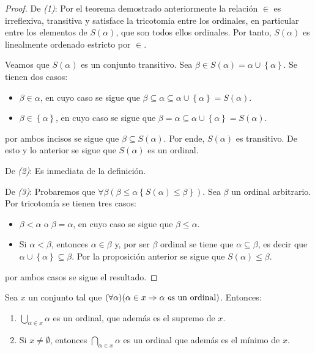 \documentclass[12pt]{report}
\newcounter{it}
\theoremstyle{largebreak}
\begin{document}
    \begin{proof}
        De \textit{(1)}: Por el teorema demostrado anteriormente la relación $\in$ es irreflexiva, transitiva y satisface la tricotomía entre los ordinales, en particular entre los elementos de $S(\alpha)$, que son todos ellos ordinales. Por tanto, $S(\alpha)$ es linealmente ordenado estricto por $\in$.

        Veamos que $S(\alpha)$ es un conjunto transitivo. Sea $\beta\in S(\alpha)=\alpha\cup\left\{\alpha\right\}$. Se tienen dos casos:
        \begin{itemize}
            \item $\beta\in\alpha$, en cuyo caso se sigue que $\beta\subseteq\alpha\subseteq\alpha\cup\left\{\alpha\right\}=S(\alpha)$.
            \item $\beta\in\left\{\alpha\right\}$, en cuyo caso se sigue que $\beta=\alpha\subseteq\alpha\cup\left\{\alpha\right\}=S(\alpha)$.            
        \end{itemize}
        por ambos incisos se sigue que $\beta\subseteq S(\alpha)$. Por ende, $S(\alpha)$ es transitivo. De esto y lo anterior se sigue que $S(\alpha)$ es un ordinal.

        De \textit{(2)}: Es inmediata de la definición.

        De \textit{(3)}: Probaremos que $\forall\beta(\beta\leq\alpha\left\{S(\alpha)\leq\beta \right\})$. Sea $\beta$ un ordinal arbitrario. Por tricotomía se tienen tres casos:
        \begin{itemize}
            \item $\beta<\alpha$ o $\beta=\alpha$, en cuyo caso se sigue que $\beta\leq\alpha$.
            \item Si $\alpha<\beta$, entonces $\alpha\in\beta$ y, por ser $\beta$ ordinal se tiene que $\alpha\subseteq\beta$, es decir que $\alpha\cup\left\{\alpha\right\}\subseteq\beta$. Por la proposición anterior se sigue que $S(\alpha)\leq\beta$.
        \end{itemize}
        por ambos casos se sigue el resultado.
    \end{proof}

    \begin{theor}
        Sea $x$ un conjunto tal que $(\forall\alpha)(\alpha\in x\Rightarrow\alpha\textup{ es un ordinal})$. Entonces:
        \begin{enumerate}[label = \textit{(\arabic*)}]
            \item $\bigcup_{\alpha\in x}\alpha$ es un ordinal, que además es el supremo de $x$.
            \item Si $x\neq\emptyset$, entonces $\bigcap_{\alpha\in x}\alpha$ es un ordinal que además es el mínimo de $x$.
        \end{enumerate}
    \end{theor}
\end{document}
